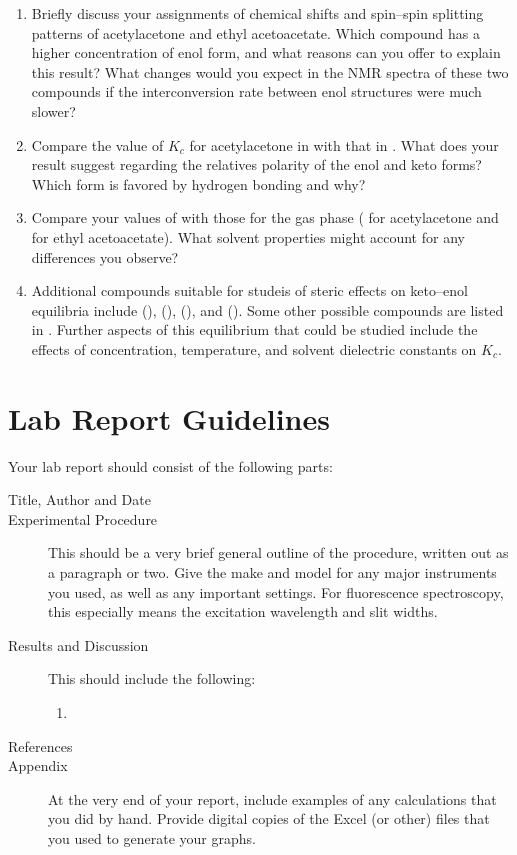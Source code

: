 \documentclass[nobib,nofonts,nols,nohyper,draft]{tufte-handout}
\begin{document}
\begin{enumerate}
	\item Briefly discuss your assignments of chemical shifts and spin--spin splitting patterns of acetylacetone and ethyl acetoacetate. 
	Which compound has a higher concentration of enol form, and what reasons can you offer to explain this result?
	What changes would you expect in the NMR spectra of these two compounds if the interconversion rate between enol structures were much slower?
	\item Compare the value of \( K_c \) for acetylacetone in  with that in . 
	What does your result suggest regarding the relatives polarity of the enol and keto forms?
	Which form is favored by hydrogen bonding and why?
	\item Compare your values of  with those for the gas phase ( for acetylacetone and  for ethyl acetoacetate).\autocite{folkendt1985a}
	What solvent properties might account for any differences you observe?
	\item Additional compounds suitable for studeis of steric effects on keto--enol equilibria include  (),  (),  (), and  ().
	Some other possible compounds are listed in \textcite{burdett1964a,rogers1956a}. Further aspects of this equilibrium that could be studied include the effects of concentration, temperature, and solvent dielectric constants on \( K_c \).\autocite{rogers1956a}
\end{enumerate}


\section{Lab Report Guidelines} %
\label{sec:lab_report_guidelines}

Your lab report should consist of the following parts:
\begin{description}
	\item[Title, Author and Date]
	\item[Experimental Procedure] This should be a very brief general outline of the procedure, written out as a paragraph or two. Give the make and model for any major instruments you used, as well as any important settings. For fluorescence spectroscopy, this especially means the excitation wavelength and slit widths.
	\item[Results and Discussion] This should include the following:
	\begin{enumerate}
		\item 
	\end{enumerate}
	\item[References]
	\item[Appendix] At the very end of your report, include examples of any calculations that you did by hand. 
	Provide digital copies of the Excel (or other) files that you used to generate your graphs.
\end{description}
\end{document}
